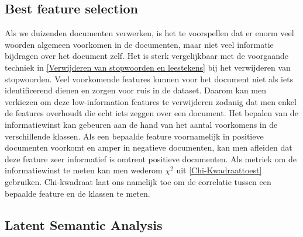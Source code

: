\subsection{Best feature selection}\label{Low-information feature el}

Als we duizenden documenten verwerken, is het te voorspellen dat er enorm veel woorden algemeen voorkomen in de documenten, maar niet veel informatie bijdragen over het document zelf. Het is sterk vergelijkbaar met de voorgaande techniek in \ref{Verwijderen van stopwoorden en leestekens} bij het verwijderen van stopwoorden. Veel voorkomende features kunnen voor het document niet als iets identificerend dienen en zorgen voor ruis in de dataset. Daarom kan men verkiezen om deze low-information features te verwijderen zodanig dat men enkel de features overhoudt die echt iets zeggen over een document. Het bepalen van de informatiewinst kan gebeuren aan de hand van het aantal voorkomens in de verschillende klassen. Als een bepaalde feature voornamelijk in positieve documenten voorkomt en amper in negatieve documenten, kan men afleiden dat deze feature zeer informatief is omtrent positieve documenten. Als metriek om de informatiewinst te meten kan men wederom ${\chi}^2$ uit \ref{Chi-Kwadraattoest} gebruiken. Chi-kwadraat laat ons namelijk toe om de correlatie tussen een bepaalde feature en de klassen te meten.
%
\subsection{Latent Semantic Analysis}\label{Latent Semantic Analysis}

